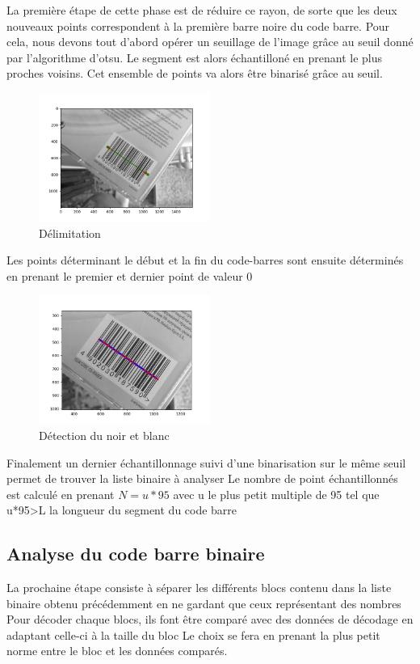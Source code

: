 \documentclass{rapport}
\begin{document}
La première étape de cette phase est de réduire ce rayon, de sorte que les deux nouveaux points correspondent à la première barre noire du code barre.
Pour cela, nous devons tout d'abord opérer un seuillage de l'image grâce au seuil donné par l'algorithme d'otsu.
Le segment est alors échantilloné en prenant le plus proches voisins. 
Cet ensemble de points va alors être binarisé grâce au seuil.

\begin{figure}[H] 
	\centering
	\includegraphics[width=0.5\textwidth]{images/binarisation.png}
	\caption{Délimitation}
	\label{fig:binarisation}
\end{figure}

Les points déterminant le début et la fin du code-barres sont ensuite déterminés en prenant le premier et dernier point de valeur 0


\begin{figure}[H] 
	\centering
	\includegraphics[width=0.5\textwidth]{images/detection.png}
	\caption{Détection du noir et blanc}
	\label{fig:detection}
\end{figure}

Finalement un dernier échantillonnage suivi d'une binarisation sur le même seuil permet de trouver la liste binaire à analyser
Le nombre de point échantillonnés est calculé en prenant $N=u*95$ avec u le plus petit multiple de 95 tel que u*95>L la longueur du segment du code barre

\subsection{Analyse du code barre binaire}
La prochaine étape consiste à séparer les différents blocs contenu dans la liste binaire obtenu précédemment en ne gardant que ceux représentant des nombres
Pour décoder chaque blocs, ils font être comparé avec des données de décodage en adaptant celle-ci à la taille du bloc 
Le choix se fera en prenant la plus petit norme entre le bloc et les données comparés. 
\end{document}
